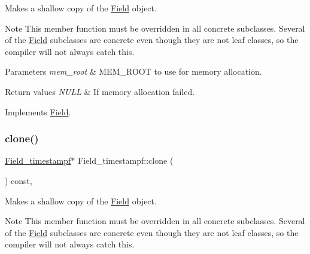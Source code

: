 Makes a shallow copy of the \mbox{\hyperlink{classField}{Field}} object.

\begin{DoxyNote}{Note}
This member function must be overridden in all concrete subclasses. Several of the \mbox{\hyperlink{classField}{Field}} subclasses are concrete even though they are not leaf classes, so the compiler will not always catch this.
\end{DoxyNote}

\begin{DoxyParams}{Parameters}
{\em mem\+\_\+root} & M\+E\+M\+\_\+\+R\+O\+OT to use for memory allocation. \\
\hline
\end{DoxyParams}

\begin{DoxyRetVals}{Return values}
{\em N\+U\+LL} & If memory allocation failed. \\
\hline
\end{DoxyRetVals}


Implements \mbox{\hyperlink{classField_a64979bcb9345803b031fff76a0c3d9fe}{Field}}.

\mbox{\label{classField__timestampf_af54ee85e3a46fb9852c2e0770e639e5b}} 
\subsubsection{\texorpdfstring{clone()}{clone()}\hspace{0.1cm}{\footnotesize\ttfamily [2/2]}}
{\footnotesize\ttfamily \mbox{\hyperlink{classField__timestampf}{Field\+\_\+timestampf}}$\ast$ Field\+\_\+timestampf\+::clone (\begin{DoxyParamCaption}{ }\end{DoxyParamCaption}) const\hspace{0.3cm}{\ttfamily [inline]}, {\ttfamily [virtual]}}

Makes a shallow copy of the \mbox{\hyperlink{classField}{Field}} object.

\begin{DoxyNote}{Note}
This member function must be overridden in all concrete subclasses. Several of the \mbox{\hyperlink{classField}{Field}} subclasses are concrete even though they are not leaf classes, so the compiler will not always catch this.
\end{DoxyNote}

